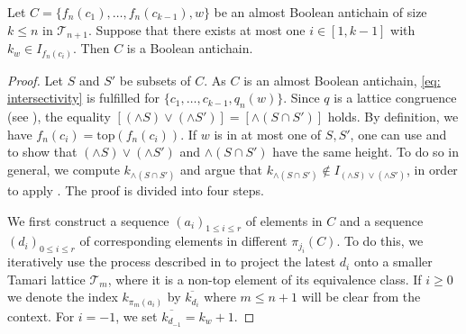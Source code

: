 \documentclass{preprint}
\newcommand{\cT}{\mathcal{T}}
\theoremstyle{definition}
\begin{document}
\begin{proposition}\label{prop: ValidAreBoolean}
    Let $C=\{f_n(c_1),\dots,f_n(c_{k-1}),w\}$ be an almost Boolean antichain of size $k\leq n$ in $\cT_{n+1}$. Suppose that there exists at most one $i \in [1,k-1]$ with $k_w \in I_{f_n(c_i)}$. Then $C$ is a Boolean antichain.
\end{proposition}
\begin{proof}
    Let $S$ and $S'$ be subsets of $ C$. As $C$ is an almost Boolean antichain, \eqref{eq: intersectivity} is fulfilled for $\{c_1, \dots, c_{k-1}, q_n(w)\}$. Since $q$ is a lattice congruence (see ), the equality $[(\wedge S) \vee (\wedge S')] = [\wedge (S\cap S')]$ holds. By definition, we have $f_n(c_i) = \text{top}(f_n(c_i))$. If $w$ is in at most one of $S, S'$, one can use  and  to show that $(\wedge S) \vee (\wedge S')$ and $\wedge (S\cap S')$ have the same height. To do so in general, we compute $k_{\wedge (S\cap S')}$ and argue that $k_{\wedge (S\cap S')}\not\in I_{(\wedge S) \vee (\wedge S')}$, in order to apply . The proof is divided into four steps.

    We first construct a sequence $(a_i)_{1\leq i\leq r}$ of elements in $C$ and a sequence $(d_i)_{0\leq i\leq r}$ of corresponding elements in different $\pi_{j_i}(C)$. To do this, we iteratively use the process described in  to project the latest $d_i$ onto a smaller Tamari lattice $\cT_m$, where it is a non-top element of its equivalence class. 
    If $i\geq 0$ we denote the index $k_{\pi_m(a_i)}$ by $\overline{k_{d_i}}$ where $m\leq n +1$ will be clear from the context. For $i = -1$, we set $\overline{k_{d_{-1}}} = k_{w}+1$.
    

\end{proof}
\end{document}
